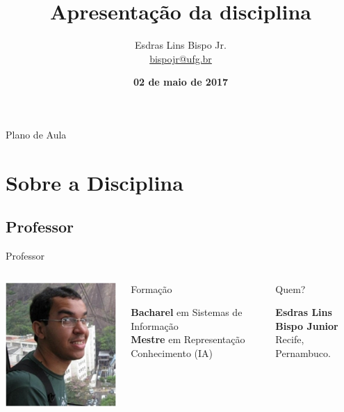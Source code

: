 \documentclass[xcolor=dvipsnames,table]{beamer}
\title{Apresentação da disciplina}
\author{
  Esdras Lins Bispo Jr. \\ \url{bispojr@ufg.br}
  }
\institute{
  Teoria de Grafos \\Bacharelado em Ciência da Computação}
\date{\textbf{02 de maio de 2017} }
\begin{document}
	\begin{frame}
		\titlepage
	\end{frame}

	\AtBeginSection{
		\begin{frame}{Sumário}%
    		\tableofcontents[currentsection]
		\end{frame}
	}

	\begin{frame}{Plano de Aula}
		\tableofcontents
	\end{frame}
	
	\section{Sobre a Disciplina}
	\subsection{Professor}
	\begin{frame}{Professor}
		\begin{columns}
			\begin{center}
				\includegraphics[height=.5\textheight]{images/esdras.png}
			\end{center}
			\begin{block}{Formação}
				\begin{center}
					{\normalsize {\bf Bacharel} em Sistemas de Informação\\
						{\bf Mestre} em Representação Conhecimento (IA)}
				\end{center}
			\end{block}		  		
			\begin{block}{Quem?}
				\begin{center}
					{\bf Esdras Lins Bispo Junior} \\ Recife, Pernambuco.
				\end{center}
			\end{block}
		\end{columns}
	\end{frame}
	
\end{document}
